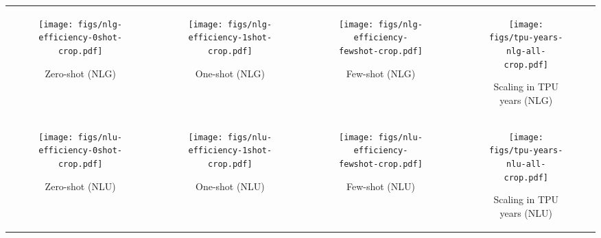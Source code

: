 \documentclass{article}
\newcommand{\glam}{GLaM\xspace}
\begin{document}
\begin{figure*}[tb]
\centering
\renewcommand\tabcolsep{2pt}
\begin{tabular}{cccc}
\begin{subfigure}[b]{0.24\textwidth}
\texttt{[image: figs/nlg-efficiency-0shot-crop.pdf]}
\caption{Zero-shot (NLG)}
\end{subfigure}
&
\begin{subfigure}[b]{0.24\textwidth}
\texttt{[image: figs/nlg-efficiency-1shot-crop.pdf]}
\caption{One-shot (NLG)}
\end{subfigure}
&
\begin{subfigure}[b]{0.24\textwidth}
\texttt{[image: figs/nlg-efficiency-fewshot-crop.pdf]}
\caption{Few-shot (NLG)}
\end{subfigure}
&
\begin{subfigure}[b]{0.24\textwidth}
\texttt{[image: figs/tpu-years-nlg-all-crop.pdf]}
\caption{Scaling in TPU years (NLG)}
\end{subfigure}
\\
\begin{subfigure}[b]{0.24\textwidth}
\texttt{[image: figs/nlu-efficiency-0shot-crop.pdf]}
\caption{Zero-shot (NLU)}
\end{subfigure}
&
\begin{subfigure}[b]{0.24\textwidth}
\texttt{[image: figs/nlu-efficiency-1shot-crop.pdf]}
\caption{One-shot (NLU)}
\end{subfigure}
&
\begin{subfigure}[b]{0.24\textwidth}
\texttt{[image: figs/nlu-efficiency-fewshot-crop.pdf]}
\caption{Few-shot (NLU)}
\end{subfigure}
&
\begin{subfigure}[b]{0.24\textwidth}
\texttt{[image: figs/tpu-years-nlu-all-crop.pdf]}
\caption{Scaling in TPU years (NLU)}
\end{subfigure}
\end{tabular}
\caption{\label{figs:efficiency} Learning efficiency comparison. Average zero-shot , one-shot and few-shot performance of \glam MoE models versus \glam dense models as more tokens are processed during training for 9 NLG tasks (a-c) and 21 NLU tasks (e-g). Panel (d) and (h) also display the learning curves against the number of TPU years, respectively. }
\end{figure*}
\end{document}
